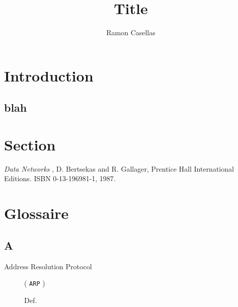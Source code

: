 \documentclass[pdftex,english,a4paper,10pt]{article}
\title{Title}
\author{Ramon Casellas}
\begin{document}
\maketitle

\section{Introduction}
\label{id2720279}\hypertarget{id2720279}{}%
\subsection{blah}
\label{id2720286}\hypertarget{id2720286}{}%

\section{Section}
\label{id2720295}\hypertarget{id2720295}{}%
%	
%	

\begin{thebibliography}{WIDELABEL}

\emph{Data Networks} , D. Bertsekas and R. Gallager, Prentice Hall International Editions. ISBN 0-13-196981-1, 1987. \label{BerGal}


\end{thebibliography}
\newcommand{\dbglossary}[1]{\section*{#1}}%
\newcommand{\dbglossdiv}[1]{\subsection*{#1}}%
% 
% 
\dbglossary{Glossaire}
\label{gloss@glossary}\hypertarget{gloss@glossary}{}%
% 
\dbglossdiv{A}
\label{id2720961}\hypertarget{id2720961}{}%
\noindent%
\begin{description}%
\item[\hypertarget{gloss@arp}{Address Resolution Protocol}]  ( {\tt ARP} ) 

Def.


\end{description}%

\end{document}
